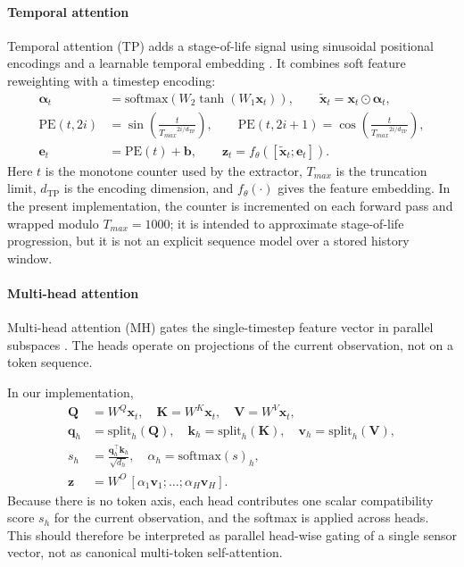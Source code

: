 \documentclass[sn-basic]{sn-jnl}%
\begin{document}
\paragraph{Temporal attention}
Temporal attention (TP) adds a stage-of-life signal using sinusoidal positional encodings and a learnable temporal embedding \cite{Vaswani2017, Lim2020TFT}. It combines soft feature reweighting with a timestep encoding:
\begin{align}
        \boldsymbol{\alpha}_t &= \mathrm{softmax}\!\left(W_2\tanh\!\left(W_1\mathbf{x}_t\right)\right),
        \qquad \tilde{\mathbf{x}}_t = \mathbf{x}_t\odot\boldsymbol{\alpha}_t,\\
        \mathrm{PE}(t,2i) &= \sin\!\left(\frac{t}{{T_{max}}^{2i/d_{\mathrm{TP}}}}\right),
        \qquad \mathrm{PE}(t,2i+1)=\cos\!\left(\frac{t}{{T_{max}}^{2i/d_{\mathrm{TP}}}}\right),\\
        \mathbf{e}_t &= \mathrm{PE}(t) + \mathbf{b},
        \qquad \mathbf{z}_t = f_\theta\!\left([\tilde{\mathbf{x}}_t;\mathbf{e}_t]\right).
\end{align}
	Here $t$ is the monotone counter used by the extractor, $T_{max}$ is the truncation limit, $d_{\mathrm{TP}}$ is the encoding dimension, and $f_\theta(\cdot)$ gives the feature embedding. In the present implementation, the counter is incremented on each forward pass and wrapped modulo $T_{max}=1000$; it is intended to approximate stage-of-life progression, but it is not an explicit sequence model over a stored history window.

\paragraph{Multi-head attention}
Multi-head attention (MH) gates the single-timestep feature vector in parallel subspaces \cite{Vaswani2017}. The heads operate on projections of the current observation, not on a token sequence.

In our implementation,
\begin{align}
        \mathbf{Q}&=W^Q\mathbf{x}_t,\quad \mathbf{K}=W^K\mathbf{x}_t,\quad \mathbf{V}=W^V\mathbf{x}_t,\\
        \mathbf{q}_h&=\mathrm{split}_h(\mathbf{Q}),\quad \mathbf{k}_h=\mathrm{split}_h(\mathbf{K}),\quad \mathbf{v}_h=\mathrm{split}_h(\mathbf{V}),\\
        s_h&=\frac{\mathbf{q}_h^\top\mathbf{k}_h}{\sqrt{d_h}},\quad \alpha_h=\mathrm{softmax}(s)_h,\\
        \mathbf{z}&=W^O\,[\alpha_1\mathbf{v}_1;\ldots;\alpha_H\mathbf{v}_H].
\end{align}
	Because there is no token axis, each head contributes one scalar compatibility score $s_h$ for the current observation, and the softmax is applied across heads. This should therefore be interpreted as parallel head-wise gating of a single sensor vector, not as canonical multi-token self-attention.
\end{document}
